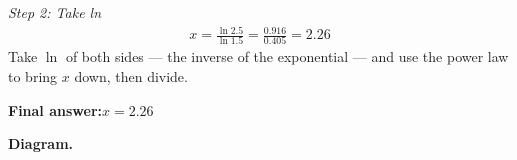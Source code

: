 \documentclass[11pt]{article}
\begin{document}
\textit{Step 2: Take ln}
\[\begin{gathered}
x = \frac{\ln 2.5}{\ln 1.5} = \frac{0.916}{0.405} = 2.26
\end{gathered}\]
Take \( \ln \) of both sides --- the inverse of the exponential --- and use the power law to bring \( x \) down, then divide.

\begin{answerbox}
\textbf{Final answer:}\quad \(\displaystyle x = 2.26\)
\end{answerbox}
\textbf{Diagram.}

\begin{center}
\end{center}
\end{document}
